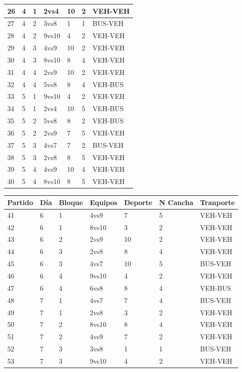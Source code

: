 \begin{center}
\begin{tabular}{|l|l|l|l|l|l|l|}
26 & 4 & 1 & 2vs4 & 10 & 2 & VEH-VEH \\ \hline
27 & 4 & 2 & 3vs8 & 1 & 1 & BUS-VEH \\ \hline
28 & 4 & 2 & 9vs10 & 4 & 2 & VEH-VEH \\ \hline
29 & 4 & 3 & 4vs9 & 10 & 2 & VEH-VEH \\ \hline
30 & 4 & 3 & 8vs10 & 8 & 4 & VEH-VEH \\ \hline
31 & 4 & 4 & 2vs9 & 10 & 2 & VEH-VEH \\ \hline
32 & 4 & 4 & 5vs8 & 8 & 4 & VEH-BUS \\ \hline
33 & 5 & 1 & 9vs10 & 4 & 2 & VEH-VEH \\ \hline
34 & 5 & 1 & 2vs4 & 10 & 5 & VEH-BUS \\ \hline
35 & 5 & 2 & 5vs8 & 8 & 2 & VEH-BUS \\ \hline
36 & 5 & 2 & 2vs9 & 7 & 5 & VEH-VEH \\ \hline
37 & 5 & 3 & 4vs7 & 7 & 2 & BUS-VEH \\ \hline
38 & 5 & 3 & 2vs8 & 8 & 5 & VEH-VEH \\ \hline
39 & 5 & 4 & 4vs9 & 10 & 4 & VEH-VEH \\ \hline
40 & 5 & 4 & 8vs10 & 8 & 5 & VEH-VEH \\ \hline 
\end{tabular}
\begin{tabular}{|l|l|l|l|l|l|l|}
\hline
Partido & Día & Bloque & Equipos & Deporte & N Cancha & Tranporte     \\
\hline \hline
41 & 6 & 1 & 4vs9 & 7 & 5 & VEH-VEH \\ \hline
42 & 6 & 1 & 8vs10 & 3 & 2 & VEH-VEH \\ \hline
43 & 6 & 2 & 2vs9 & 10 & 2 & VEH-VEH \\ \hline
44 & 6 & 3 & 2vs8 & 8 & 4 & VEH-VEH \\ \hline
45 & 6 & 3 & 4vs7 & 10 & 5 & BUS-VEH \\ \hline
46 & 6 & 4 & 9vs10 & 4 & 2 & VEH-VEH \\ \hline
47 & 6 & 4 & 6vs8 & 8 & 4 & VEH-BUS \\ \hline
48 & 7 & 1 & 4vs7 & 7 & 4 & BUS-VEH \\ \hline
49 & 7 & 1 & 2vs8 & 3 & 2 & VEH-VEH \\ \hline
50 & 7 & 2 & 8vs10 & 8 & 4 & VEH-VEH \\ \hline
51 & 7 & 2 & 4vs9 & 7 & 2 & VEH-VEH \\ \hline
52 & 7 & 3 & 3vs8 & 1 & 1 & BUS-VEH \\ \hline
53 & 7 & 3 & 9vs10 & 4 & 2 & VEH-VEH \\ \hline

\end{tabular}
\end{center}
